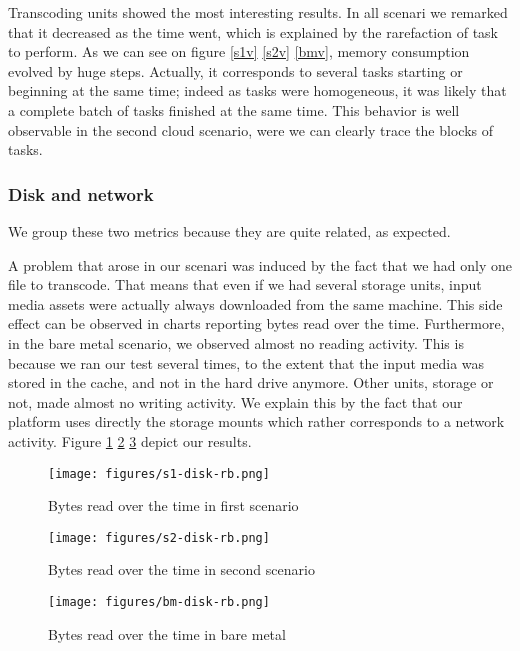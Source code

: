 \documentclass[a4paper, titlepage]{paper}
\numberwithin{figure}{section}
\numberwithin{table}{section}
\begin{document}
        Transcoding units showed the most interesting results. In all scenari we remarked that it decreased as the time went, which is explained by the rarefaction of task to perform. As we can see on figure \ref{s1v} \ref{s2v} \ref{bmv}, memory consumption evolved by huge steps. Actually, it corresponds to several tasks starting or beginning at the same time; indeed as tasks were homogeneous, it was likely that a complete batch of tasks finished at the same time. This behavior is well observable in the second cloud scenario, were we can clearly trace the blocks of tasks.

      \subsubsection{Disk and network}
        We group these two metrics because they are quite related, as expected.

        A problem that arose in our scenari was induced by the fact that we had only one file to transcode. That means that even if we had several storage units, input media assets were actually always downloaded from the same machine. This side effect can be observed in charts reporting bytes read over the time. Furthermore, in the bare metal scenario, we observed almost no reading activity. This is because we ran our test several times, to the extent that the input media was stored in the cache, and not in the hard drive anymore. Other units, storage or not, made almost no writing activity. We explain this by the fact that our platform uses directly the storage mounts which rather corresponds to a network activity. Figure \ref{s1dbr} \ref{s2dbr} \ref{bmdbr} depict our results.
        
        \begin{figure}
          \centering
          \texttt{[image: figures/s1-disk-rb.png]}
          \caption{Bytes read over the time in first scenario}
          \label{s1dbr}
        \end{figure}
        \begin{figure}
          \centering
          \texttt{[image: figures/s2-disk-rb.png]}
          \caption{Bytes read over the time in second scenario}
          \label{s2dbr}
        \end{figure}
        \begin{figure}
          \centering
          \texttt{[image: figures/bm-disk-rb.png]}
          \caption{Bytes read over the time in bare metal}
          \label{bmdbr}
        \end{figure}
\end{document}
